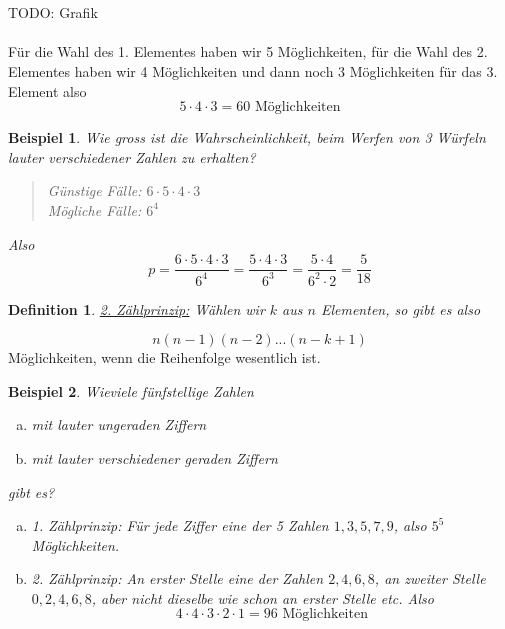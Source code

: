 \documentclass{report}
\newtheorem{mydef}{Definition}
\newtheorem{myexample}{Beispiel}
\begin{document}
\\\\TODO: Grafik\\\\
Für die Wahl des 1. Elementes haben wir 5 Möglichkeiten, für die Wahl des 2. Elementes haben wir 4 Möglichkeiten und dann noch 3 Möglichkeiten für das 3. Element also
\begin{equation}
5 \cdot 4 \cdot 3 = 60 \mbox{ Möglichkeiten}
\end{equation}
\begin{myexample}
Wie gross ist die Wahrscheinlichkeit, beim Werfen von 3 Würfeln lauter verschiedener Zahlen zu erhalten?
\begin{quote}
Günstige Fälle: $6 \cdot 5 \cdot 4 \cdot 3$\\
Mögliche Fälle: $6^4$
\end{quote}
Also
\begin{equation}
p = \frac{6 \cdot 5 \cdot 4 \cdot 3}{6^4} = \frac{5 \cdot 4 \cdot 3}{6^3} = \frac{5 \cdot 4}{6^2 \cdot 2} = \frac{5}{18}
\end{equation}
\end{myexample}
\begin{mydef}
\underline{2. Zählprinzip:} Wählen wir $k$ aus $n$ Elementen, so gibt es also
\end{mydef}
\begin{equation}
n (n-1) (n-2) ... (n-k+1)
\end{equation}
Möglichkeiten, wenn die Reihenfolge wesentlich ist.
\begin{myexample}
Wieviele fünfstellige Zahlen
\begin{enumerate}[(a)]
\item
mit lauter ungeraden Ziffern
\item
mit lauter verschiedener geraden Ziffern
\end{enumerate}
gibt es?
\begin{enumerate}[(a)]
\item
1. Zählprinzip: Für jede Ziffer eine der 5 Zahlen $1,3,5,7,9$, also $5^5$ Möglichkeiten.
\item
2. Zählprinzip: An erster Stelle eine der Zahlen $2,4,6,8$, an zweiter Stelle $0,2,4,6,8$, aber nicht dieselbe wie schon an erster Stelle etc. Also
\begin{equation}
4 \cdot 4 \cdot 3 \cdot 2 \cdot 1 = 96 \mbox{ Möglichkeiten}
\end{equation}
\end{enumerate}
\end{myexample}
\end{document}
